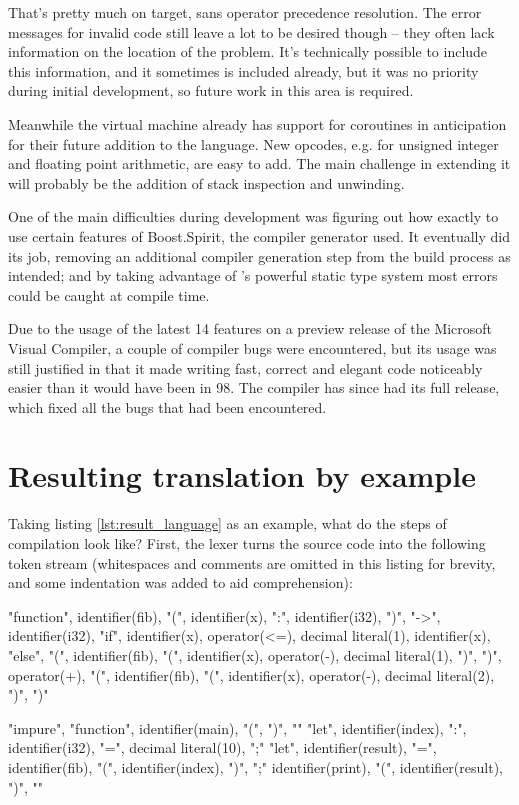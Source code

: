 That's pretty much on target, sans operator precedence resolution. The error messages for invalid code still leave a lot to be desired though -- they often lack information on the location of the problem. It's technically possible to include this information, and it sometimes is included already, but it was no priority during initial development, so future work in this area is required.

Meanwhile the virtual machine already has support for coroutines in anticipation for their future addition to the language. New opcodes, e.g. for unsigned integer and floating point arithmetic, are easy to add. The main challenge in extending it will probably be the addition of stack inspection and unwinding.

One of the main difficulties during development was figuring out how exactly to use certain features of Boost.Spirit, the compiler generator used. It eventually did its job, removing an additional compiler generation step from the build process as intended; and by taking advantage of \CC's powerful static type system most errors could be caught at compile time.

Due to the usage of the latest {\CC}14 features on a preview release of the Microsoft Visual {\CC} Compiler, a couple of compiler bugs were encountered, but its usage was still justified in that it made writing fast, correct and elegant code noticeably easier than it would have been in {\CC}98. The compiler has since had its full release, which fixed all the bugs that had been encountered.


\section{Resulting translation by example}

Taking listing \ref{lst:result_language} as an example, what do the steps of compilation look like? First, the lexer turns the source code into the following token stream (whitespaces and comments are omitted in this listing for brevity, and some indentation was added to aid comprehension):

\begin{codelisting}[caption="Abridged tokens of listing \ref{lst:result_language}"]
"function", identifier(fib), "(", identifier(x), ":", identifier(i32), ")", "->", identifier(i32),
    "if", identifier(x), operator(<=), decimal literal(1),
        identifier(x),
    "else",
        "(", identifier(fib), "(", identifier(x), operator(-), decimal literal(1), ")", ")", operator(+), "(", identifier(fib), "(", identifier(x), operator(-), decimal literal(2), ")", ")"

"impure", "function", identifier(main), "(", ")",
"{"
    "let", identifier(index), ":", identifier(i32), "=", decimal literal(10), ";"
    "let", identifier(result), "=", identifier(fib), "(", identifier(index), ")", ";"
    identifier(print), "(", identifier(result), ")",
"}"
\end{codelisting}

